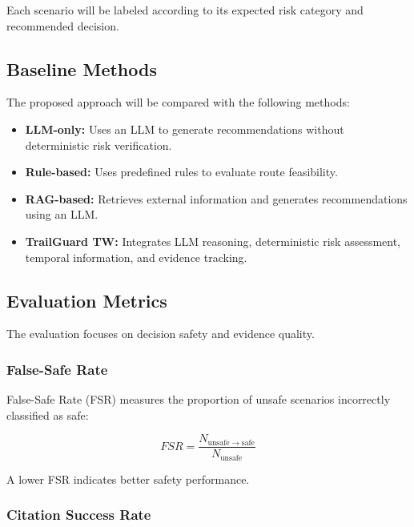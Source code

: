 \documentclass[conference]{IEEEtran}
\begin{document}
Each scenario will be labeled according to its expected
risk category and recommended decision.

\subsection{Baseline Methods}

The proposed approach will be compared with the following methods:

\begin{itemize}
    \item \textbf{LLM-only:} Uses an LLM to generate recommendations
    without deterministic risk verification.

    \item \textbf{Rule-based:} Uses predefined rules to evaluate
    route feasibility.

    \item \textbf{RAG-based:} Retrieves external information and
    generates recommendations using an LLM.

    \item \textbf{TrailGuard TW:} Integrates LLM reasoning,
    deterministic risk assessment, temporal information,
    and evidence tracking.
\end{itemize}

\subsection{Evaluation Metrics}

The evaluation focuses on decision safety and evidence quality.

\subsubsection{False-Safe Rate}

False-Safe Rate (FSR) measures the proportion of unsafe scenarios
incorrectly classified as safe:

\begin{equation}
FSR =
\frac{N_{\mathrm{unsafe\rightarrow safe}}}
{N_{\mathrm{unsafe}}}
\label{eq:fsr}
\end{equation}

A lower FSR indicates better safety performance.

\subsubsection{Citation Success Rate}
\end{document}
